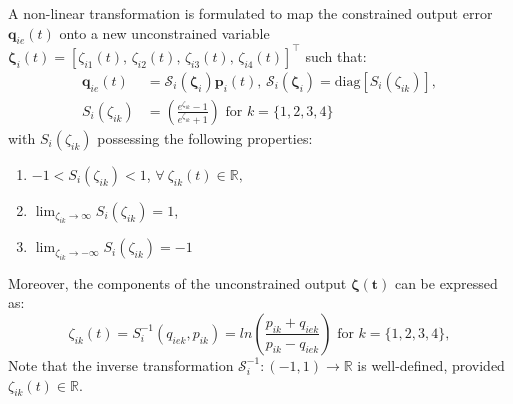 \documentclass[lettersize,journal]{IEEEtran}
\begin{document}
A non-linear transformation is formulated to map the constrained output error $\boldsymbol{q}_{ie}(t)$ onto a new unconstrained variable $\boldsymbol{\zeta}_i(t) = [\zeta_{i 1}(t),\, \zeta_{i 2}(t),\, \zeta_{i 3}(t),\, \zeta_{i 4}(t)]^{\top}$ such that:
\begin{align}
    \label{error transformation for inner loop: equation}
    \boldsymbol{q}_{ie}(t) &= \mathcal{S}_i(\boldsymbol{\zeta}_i) \boldsymbol{p}_i(t), \, \mathcal{S}_i(\boldsymbol{\zeta}_i) = \text{diag}[S_i(\zeta_{ik})], \nonumber \\
    S_i(\zeta_{ik}) &= \left(\frac{e^{\zeta_{ik}} - 1}{e^{\zeta_{ik}} + 1} \right) \text{ for } k = \{1, 2, 3, 4\}
\end{align}
with $S_i(\zeta_{ik})$ possessing the following properties:
\begin{enumerate}
    \item[I.] $ -1 < S_i(\zeta_{ik}) < 1 $, $\forall~\zeta_{ik}(t) \in \mathbb{R},$ 
    \item[II.] $\lim_{\zeta_{ik} \to \infty} S_i(\zeta_{ik}) = 1$,
    \item[III.] $\lim_{\zeta_{ik} \to -\infty} S_i(\zeta_{ik}) = -1$
\end{enumerate}

Moreover, the components of the unconstrained output $\boldsymbol{\zeta(t)}$ can be expressed as:
\begin{equation} \label{inverse transformation function for inner loop}
    \zeta_{ik}(t) = S^{-1}_i(q_{ie k}, p_{i k}) = ln \left(\frac{p_{i k} + q_{ie k}}{p_{i k} - q_{ie k}} \right) \text{ for } k = \{1, 2, 3, 4\},
\end{equation}
Note that the inverse transformation $\mathcal{S}_i^{-1}: (-1, 1) \to \mathbb{R}$ is well-defined, provided $\zeta_{ik}(t) \in \mathbb{R}$.
\end{document}
